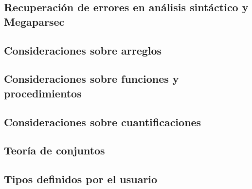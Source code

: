 \subsection{Recuperación de errores en análisis sintáctico y Megaparsec}
\blindtext[1]

\subsection{Consideraciones sobre arreglos}
\blindtext[1]

\subsection{Consideraciones sobre funciones y procedimientos}
\blindtext[1]

\subsection{Consideraciones sobre cuantificaciones}
\blindtext[1]

\subsection{Teoría de conjuntos}
\blindtext[1]

\subsection{Tipos definidos por el usuario}
\blindtext[1]

